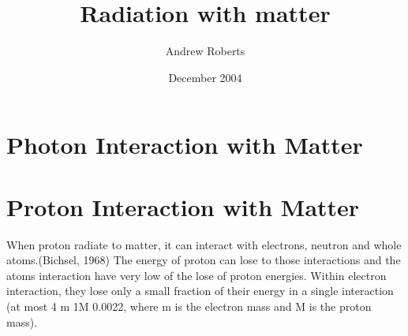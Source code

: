 \documentclass[12pt,a4paper]{article}
\begin{document}
\title{Radiation with matter}
\author{Andrew Roberts}
\date{December 2004}
\maketitle

\section{Photon Interaction with Matter}



\section{Proton Interaction with Matter}

When proton radiate to matter, it can interact with electrons, neutron and whole atoms.(Bichsel, 1968) The energy of proton can lose to those interactions and the atoms interaction have very low of the lose of proton energies. Within electron interaction, they lose only a small fraction of their energy in a single interaction (at most 4 m 1M 0.0022, where m is the
electron mass and M is the proton mass). 
\end{document}
